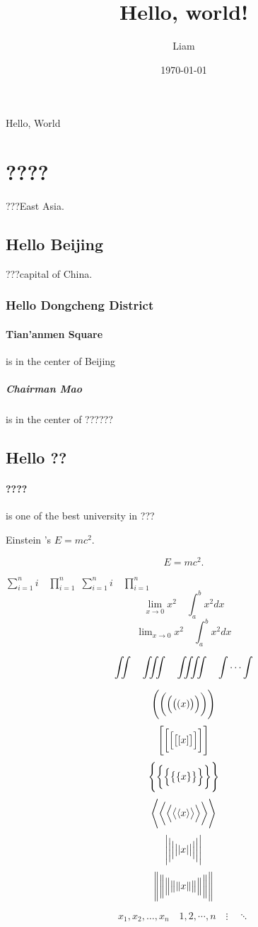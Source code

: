 \documentclass[UTF8]{article}
\title{Hello, world!}
\author{Liam}
\date{\today}
\begin{document}
\maketitle
\tableofcontents
Hello, World
\section{????}
???East Asia.
\subsection{Hello Beijing}
???capital of China.
\subsubsection{Hello Dongcheng District}
\paragraph{Tian'anmen Square}
is in the center of Beijing
\subparagraph{Chairman Mao}
is in the center of ??????
\subsection{Hello ??}
\paragraph{????} is one of the best university in ???

Einstein 's $E=mc^2$.

\[ E=mc^2. \]

$ \sum_{i=1}^n i\quad \prod_{i=1}^n $
$ \sum\limits _{i=1}^n i\quad \prod\limits _{i=1}^n $
\[ \lim_{x\to0}x^2 \quad \int_a^b x^2 dx \]
\[ \lim\nolimits _{x\to0}x^2\quad \int\nolimits_a^b x^2 dx \]

\[ \iint\quad \iiint\quad \iiiint\quad \idotsint \]

\[ \Biggl(\biggl(\Bigl(\bigl((x)\bigr)\Bigr)\biggr)\Biggr) \]
\[ \Biggl[\biggl[\Bigl[\bigl[[x]\bigr]\Bigr]\biggr]\Biggr] \]
\[ \Biggl \{\biggl \{\Bigl \{\bigl \{\{x\}\bigr \}\Bigr \}\biggr \}\Biggr\} \]
\[ \Biggl\langle\biggl\langle\Bigl\langle\bigl\langle\langle x
\rangle\bigr\rangle\Bigr\rangle\biggr\rangle\Biggr\rangle \]
\[ \Biggl\lvert\biggl\lvert\Bigl\lvert\bigl\lvert\lvert x
\rvert\bigr\rvert\Bigr\rvert\biggr\rvert\Biggr\rvert \]
\[ \Biggl\lVert\biggl\lVert\Bigl\lVert\bigl\lVert\lVert x
\rVert\bigr\rVert\Bigr\rVert\biggr\rVert\Biggr\rVert \]

\[ x_1,x_2,\dots ,x_n\quad 1,2,\cdots ,n\quad
\vdots\quad \ddots \]
\end{document}
